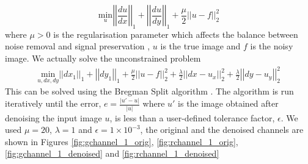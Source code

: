 \documentclass[a4paper,11pt]{ijamas}
\begin{document}
\begin{equation}
\underset{u} {\mathrm{min}} \left| \left| \frac{du}{dx} \right| \right|_1 + \left| \left| \frac{du}{dy} \right| \right|_1 + \frac{\mu}{2} \left| \left| u-f \right| \right|^2_2
\label{equ:anisotropic_tv_constrained}
\end{equation}
where $\mu > 0$ is the regularisation parameter which affects the balance between noise removal and signal preservation \cite{getreuer:2012}, $u$ is the true image and $f$ is the noisy image. We actually solve the unconstrained problem
\begin{multline}
\underset{u, dx, dy} {\mathrm{min}} \left| \left|dx_1 \right| \right|_1 + \left| \left| dy_1 \right| \right|_1 + \frac{\mu}{2} \left| \left| u-f \right| \right|^2_2 +
 \frac{\lambda}{2} \left| \left| dx-u_x \right| \right|^2_2 + \frac{\lambda}{2} \left| \left| dy-u_y \right| \right|^2_2
\label{equ:anisotropic_tv_unconstrained}
\end{multline}
This can be solved using the Bregman Split algorithm \cite{wei:2010}.
The algorithm is run iteratively until the error, $e = \frac{\vert u'-u \vert}{\vert u \vert}$ where $u'$ is the image obtained after denoising the input image $u$, is less than a user-defined tolerance factor, $\epsilon$. We used  $\mu=20$, $\lambda=1$ and $\epsilon=1 \times 10^{-3}$, the original and the denoised channels are shown in Figures \ref{fig:gchannel_1_orig}, \ref{fig:rchannel_1_orig}, \ref{fig:gchannel_1_denoised} and \ref{fig:rchannel_1_denoised}
\end{document}

